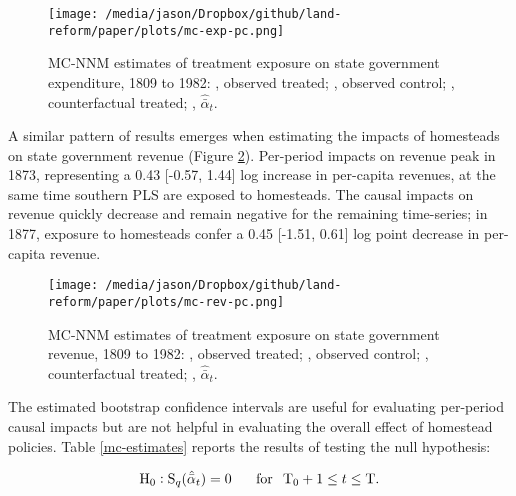 \begin{figure}[htbp]
	\centering
	\texttt{[image: /media/jason/Dropbox/github/land-reform/paper/plots/mc-exp-pc.png]}
	\caption{MC-NNM estimates of treatment exposure on state government expenditure, 1809 to 1982:
		{\color{Darjeeling15}{\sampleline{}}}, observed treated;
		{}, observed control;
		{}, counterfactual treated;
		{}, $\hat{\bar{\alpha}}_{t}$.\label{mc-estimates-exp-pc}} 
\end{figure}

A similar pattern of results emerges when estimating the impacts of homesteads on state government revenue (Figure \ref{mc-estimates-rev-pc}). Per-period impacts on revenue peak in 1873, representing a 0.43 [-0.57, 1.44] log increase in per-capita revenues, at the same time southern PLS are exposed to homesteads. The causal impacts on revenue quickly decrease and remain negative for the remaining time-series; in 1877, exposure to homesteads confer a 0.45 [-1.51, 0.61] log point decrease in per-capita revenue. 

\begin{figure}[htbp]
	\centering
	\texttt{[image: /media/jason/Dropbox/github/land-reform/paper/plots/mc-rev-pc.png]}
	\caption{MC-NNM estimates of treatment exposure on state government revenue, 1809 to 1982:
		{\color{Darjeeling15}{\sampleline{}}}, observed treated;
		{}, observed control;
		{}, counterfactual treated;
		{}, $\hat{\bar{\alpha}}_{t}$.\label{mc-estimates-rev-pc}} 
\end{figure}

The estimated bootstrap confidence intervals are useful for evaluating per-period causal impacts but are not helpful in evaluating the overall effect of homestead policies. Table \ref{mc-estimates} reports the results of testing the null hypothesis:

\begin{equation} \label{h0}
\text{H}_0: \text{S}_q (\hat{\bar{\alpha}}_{t}) = 0  \, \hspace{5mm} \,  \text{for} \, \hspace{2mm}  \text{T}_0 + 1 \leq t \leq \text{T}.
\end{equation}
\noindent

